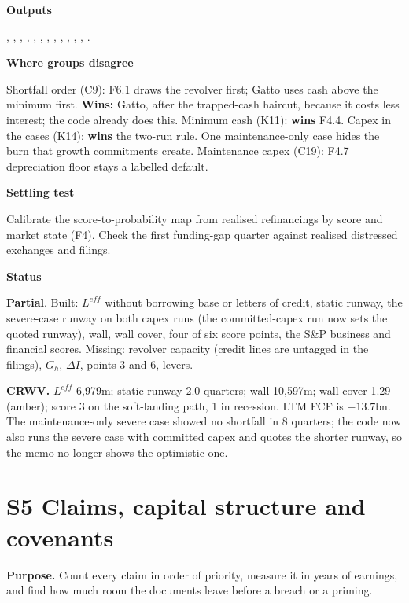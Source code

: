 \documentclass[11pt]{article}
\newcommand{\stpartial}{\textcolor{warn}{\textbf{Partial}}}
\newcommand{\fld}[1]{\par\medskip\noindent\textbf{\textcolor{steel}{#1}}\par\nopagebreak}
\begin{document}
\fld{Outputs} , , , , , , , , , , , , .

\fld{Where groups disagree} Shortfall order (C9): F6.1 draws the revolver first; Gatto uses cash above the minimum first. \textbf{Wins:} Gatto, after the trapped-cash haircut, because it costs less interest; the code already does this. Minimum cash (K11): \textbf{wins} F4.4. Capex in the cases (K14): \textbf{wins} the two-run rule. One maintenance-only case hides the burn that growth commitments create. Maintenance capex (C19): F4.7 depreciation floor stays a labelled default.

\fld{Settling test} Calibrate the score-to-probability map from realised refinancings by score and market state (F4). Check the first funding-gap quarter against realised distressed exchanges and filings.

\fld{Status} \stpartial. Built: $L^{eff}$ without borrowing base or letters of credit, static runway, the severe-case runway on both capex runs (the committed-capex run now sets the quoted runway), wall, wall cover, four of six score points, the S\&P business and financial scores. Missing: revolver capacity (credit lines are untagged in the filings), $G_h$, $\Delta I$, points 3 and 6, levers.

\begin{flagbox}
\textbf{CRWV.} $L^{eff}$ 6,979m; static runway 2.0 quarters; wall 10,597m; wall cover 1.29 (amber); score 3 on the soft-landing path, 1 in recession. LTM FCF is $-13.7$bn. The maintenance-only severe case showed no shortfall in 8 quarters; the code now also runs the severe case with committed capex and quotes the shorter runway, so the memo no longer shows the optimistic one.
\end{flagbox}
\section{S5 Claims, capital structure and covenants}\label{s5}

\textbf{Purpose.} Count every claim in order of priority, measure it in years of earnings, and find how much room the documents leave before a breach or a priming.
\end{document}
